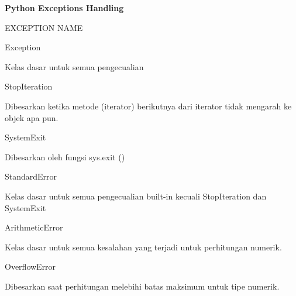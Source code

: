 \sloppy
\begin{center}{\fontsize{24pt}{24pt}\selectfont \textbf{Python Exceptions Handling}  \\}\end{center} \par
\vspace{12pt}
\vspace{12pt}
\noindent 
EXCEPTION NAME \hspace*{0.5in}  \hspace*{0.5in}  \hspace*{0.5in}  \hspace*{0.5in}  \par
\noindent 
Exception \hspace*{0.5in}  \hspace*{0.5in}  \par
\noindent 
Kelas dasar untuk semua pengecualian \par
\vspace{12pt}
\noindent 
StopIteration \hspace*{0.5in}  \par
\noindent 
Dibesarkan ketika metode (iterator) berikutnya dari iterator tidak mengarah ke objek apa pun. \par
\vspace{12pt}
\noindent 
SystemExit \hspace*{0.5in}  \hspace*{0.5in}  \par
\noindent 
Dibesarkan oleh fungsi sys.exit () \par
\vspace{12pt}
\noindent 
StandardError \hspace*{0.5in}  \par
\noindent 
Kelas dasar untuk semua pengecualian built-in kecuali StopIteration dan SystemExit \par
\vspace{12pt}
\noindent 
ArithmeticError \hspace*{0.5in}  \hspace*{0.5in}  \par
\noindent 
Kelas dasar untuk semua kesalahan yang terjadi untuk perhitungan numerik. \par
\vspace{12pt}
\noindent 
OverflowError \hspace*{0.5in}  \hspace*{0.5in}  \par
\noindent 
Dibesarkan saat perhitungan melebihi batas maksimum untuk tipe numerik. \par
